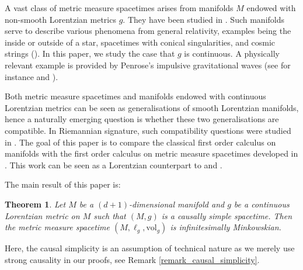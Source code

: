 \documentclass[a4paper,10pt]{article}
\newtheorem{maintheorem}{Theorem}
\numberwithin{equation}{section}
\newcommand{\vol}{\mathrm{vol}}
\begin{document}
A vast class of metric measure spacetimes arises from manifolds $M$ endowed with non-smooth Lorentzian metrics $g$.
They have been studied in \cite{chrusciel2012lorentzian, samann2016global, graf2020singularity, calisti2025hawking}. Such manifolds serve to describe various phenomena from general relativity, examples being the inside or outside of a star, spacetimes with conical singularities, and cosmic strings (\cite{vickers1990quasi, vickers2000generalized}). 
In this paper, we study the case that $g$ is continuous. A physically relevant example is provided by Penrose's impulsive gravitational waves (see for instance \cite{penrose1972geometry} and \cite[Chapter 20]{griffiths2009exact}).

Both metric measure spacetimes and manifolds endowed with continuous Lorentzian metrics can be seen as generalisations of smooth Lorentzian manifolds, hence a naturally emerging question is whether these two generalisations are compatible. In Riemannian signature, such compatibility questions were studied in \cite{burtscher2012length, kunzinger2022synthetic, mondino2025equivalence, kunzinger2025ricci, eros2025distributional}. 
The goal of this paper is to compare the classical first order calculus on manifolds with the first order calculus on metric measure spacetimes developed in \cite{beran2024nonlinear}. This work can be seen as a Lorentzian counterpart to \cite{burtscher2012length} and \cite[Section 4]{mondino2025equivalence}.

The main result of this paper is:

\begin{maintheorem}\label{mainthm}
    Let $M$ be a $(d+1)$-dimensional manifold and $g$ be a continuous Lorentzian metric on $M$ such that $(M, g)$ is a causally simple spacetime.
    Then the metric measure spacetime $(M, \ell_g, \vol_g)$ is infinitesimally Minkowskian. 
\end{maintheorem}

Here, the causal simplicity is an assumption of technical nature as we merely use strong causality in our proofs, see Remark \ref{remark_causal_simplicity}.
\end{document}
